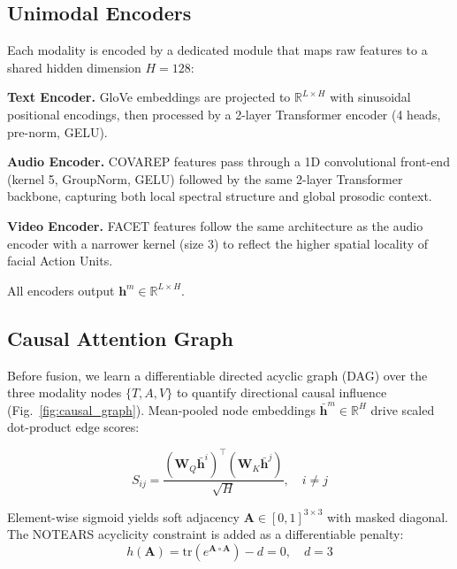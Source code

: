 \documentclass[conference]{IEEEtran}
\begin{document}
\subsection{Unimodal Encoders}

Each modality is encoded by a dedicated module that maps raw features to a
shared hidden dimension $H = 128$:

\textbf{Text Encoder.}
GloVe embeddings are projected to $\mathbb{R}^{L \times H}$ with sinusoidal
positional encodings, then processed by a 2-layer Transformer encoder
(4 heads, pre-norm, GELU).

\textbf{Audio Encoder.}
COVAREP features pass through a 1D convolutional front-end (kernel 5, GroupNorm,
GELU) followed by the same 2-layer Transformer backbone, capturing both local
spectral structure and global prosodic context.

\textbf{Video Encoder.}
FACET features follow the same architecture as the audio encoder with a narrower
kernel (size 3) to reflect the higher spatial locality of facial Action Units.

All encoders output $\mathbf{h}^m \in \mathbb{R}^{L \times H}$.

\subsection{Causal Attention Graph}
\label{sec:causal_graph}

Before fusion, we learn a differentiable directed acyclic graph (DAG) over the
three modality nodes $\{T, A, V\}$ to quantify directional causal influence
(Fig.~\ref{fig:causal_graph}).  Mean-pooled node embeddings
$\bar{\mathbf{h}}^m \in \mathbb{R}^H$ drive scaled dot-product edge scores:

\begin{equation}
    S_{ij} = \frac{(\mathbf{W}_Q \bar{\mathbf{h}}^i)^\top
                   (\mathbf{W}_K \bar{\mathbf{h}}^j)}{\sqrt{H}},
    \quad i \neq j
\end{equation}

Element-wise sigmoid yields soft adjacency $\mathbf{A} \in [0,1]^{3\times3}$
with masked diagonal.  The NOTEARS acyclicity constraint \cite{zheng2018notears}
is added as a differentiable penalty:
\begin{equation}
    h(\mathbf{A}) = \mathrm{tr}\!\left(e^{\mathbf{A} \circ \mathbf{A}}\right) - d = 0,
    \quad d = 3
\end{equation}
\end{document}
